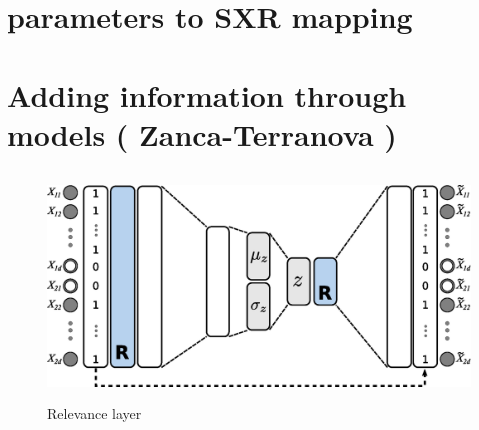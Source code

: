 \section{parameters to SXR mapping}



\section{Adding information through models ( Zanca-Terranova )}


\begin{figure}
    \centering
    \includegraphics[height=6cm]{img/STEP12_7/VAE_RELEVANCE.eps}
    \caption{Relevance layer}
    \label{fig:my_label}
\end{figure}

